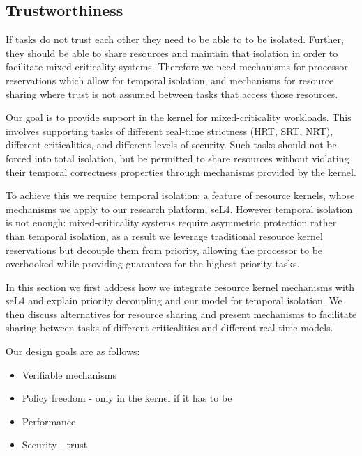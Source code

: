 
\subsection{Trustworthiness}

If tasks do not trust each other they need to be able to to be isolated.
Further, they should be able to share resources and maintain that isolation in order to facilitate
mixed-criticality systems.
Therefore we need mechanisms for processor reservations which allow for temporal isolation, and
mechanisms for resource sharing where trust is not assumed between tasks that access those
resources.








Our goal is to provide support in the kernel for mixed-criticality workloads.
This involves supporting tasks of different real-time strictness (\gls{HRT}, \gls{SRT}, \gls{NRT}), different criticalities, and different levels of security.
Such tasks should not be forced into total isolation, but be permitted to share resources without violating their temporal correctness properties through mechanisms provided by the kernel.

To achieve this we require temporal isolation: a feature of resource kernels, whose mechanisms we apply to our research platform, seL4.
However temporal isolation is not enough: mixed-criticality systems require asymmetric protection rather than temporal isolation, as a result we leverage traditional resource kernel reservations but decouple them from priority, allowing the processor to be overbooked while providing guarantees for the highest priority tasks.

In this section we first address how we integrate resource kernel mechanisms with seL4 and explain priority decoupling and our model for temporal isolation.
We then discuss alternatives for resource sharing and present mechanisms to facilitate sharing between tasks of different criticalities and different real-time models.

Our design goals are as follows:

\begin{itemize}
\item Verifiable mechanisms
\item Policy freedom - only in the kernel if it has to be
\item Performance
\item Security - trust
\end{itemize}





